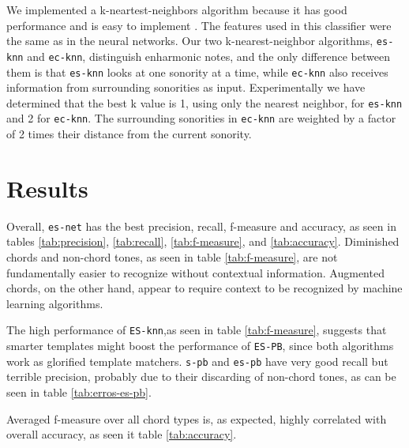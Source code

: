 \documentclass{article}
\begin{document}
We implemented a k-neartest-neighbors algorithm because it has good
performance and is easy to implement \cite{fix.ea89:important,
  gomez.ea04:estimating}. The features used in this classifier were the
same as in the neural networks. Our two k-nearest-neighbor algorithms,
\texttt{es-knn} and \texttt{ec-knn}, distinguish enharmonic notes, and
the only difference between them is that \texttt{es-knn} looks at one
sonority at a time, while \texttt{ec-knn} also receives information
from surrounding sonorities as input. Experimentally we have
determined that the best k value is 1, using only the nearest
neighbor, for \texttt{es-knn} and 2 for \texttt{ec-knn}. The
surrounding sonorities in \texttt{ec-knn} are weighted by a factor of
2 times their distance from the current sonority.

\section{Results}
\label{sec:discussion}


Overall, \texttt{es-net} has the best precision, recall, f-measure and
accuracy, as seen in tables \ref{tab:precision}, \ref{tab:recall},
\ref{tab:f-measure}, and \ref{tab:accuracy}. Diminished chords and
non-chord tones, as seen in table \ref{tab:f-measure}, are not
fundamentally easier to recognize without contextual
information. Augmented chords, on the other hand, appear to require
context to be recognized by machine learning algorithms.

The high performance of \texttt{ES-knn},as seen in table
\ref{tab:f-measure}, suggests that smarter templates might boost the
performance of \texttt{ES-PB}, since both algorithms work as glorified
template matchers. \texttt{s-pb} and \texttt{es-pb} have very good
recall but terrible precision, probably due to their discarding of
non-chord tones, as can be seen in table \ref{tab:erros-es-pb}. 

Averaged f-measure over all chord types is, as expected, highly
correlated with overall accuracy, as seen it table \ref{tab:accuracy}.
\end{document}
